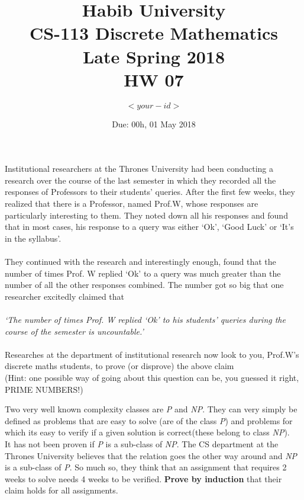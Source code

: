 \documentclass[addpoints]{exam}
\title{Habib University\\CS-113 Discrete Mathematics\\Late Spring 2018\\HW 07}
\author{$<your-id>$}
\date{Due: 00h, 01 May 2018}
\begin{document}
	\maketitle
	\begin{questions}
		
		
		
		\question
		Institutional researchers at the Thrones University had been conducting a research over the course of the last semester in which they recorded all the responses of Professors to their students' queries. After the first few weeks, they realized that there is a Professor, named Prof.W, whose responses are particularly interesting to them. They noted down all his responses and found that in most cases, his response to a query was either `Ok', `Good Luck' or `It's in the syllabus'. \\ \\
		They continued with the research and interestingly enough, found that the number of times Prof. W replied `Ok' to a query was much greater than the number of all the other responses combined. The number got so big that one researcher excitedly claimed that \\ \\ \textit{`The number of times Prof. W replied `Ok' to his students' queries during the course of the semester is uncountable.'} \\ \\
		Researches at the department of institutional research now look to you, Prof.W's discrete maths students, to prove (or disprove) the above claim \\
		(Hint: one possible way of going about this question can be, you guessed it right, PRIME NUMBERS!)
		\begin{solution}
		\end{solution}
		
		
		\question  
		Two very well known complexity classes are \textit{P} and \textit{NP}. They can very simply be defined as problems that are easy to solve (are of the class \textit{P}) and problems for which its easy to verify if a given solution is correct(these belong to class \textit{NP}).\\
		It has not been proven if \textit{P} is a sub-class of \textit{NP}. The CS department at the Thrones University believes that the relation goes the other way around and \textit{NP} is a sub-class of \textit{P}. So much so, they think that an assignment that requires 2 weeks to solve needs 4 weeks to be verified. \textbf{Prove by induction} that their claim holds for all assignments. \\
		

\end{questions}
\end{document}
